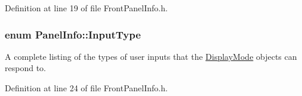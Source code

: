 Definition at line 19 of file Front\-Panel\-Info.\-h.

\hypertarget{namespace_panel_info_aeeb3b627166cd15c3898f93a1a499c65}{
\subsubsection[{Input\-Type}]{\setlength{\rightskip}{0pt plus 5cm}enum {\bf Panel\-Info\-::\-Input\-Type}}}\label{namespace_panel_info_aeeb3b627166cd15c3898f93a1a499c65}
A complete listing of the types of user inputs that the \hyperlink{class_display_mode}{Display\-Mode} objects can respond to. 

Definition at line 24 of file Front\-Panel\-Info.\-h.

